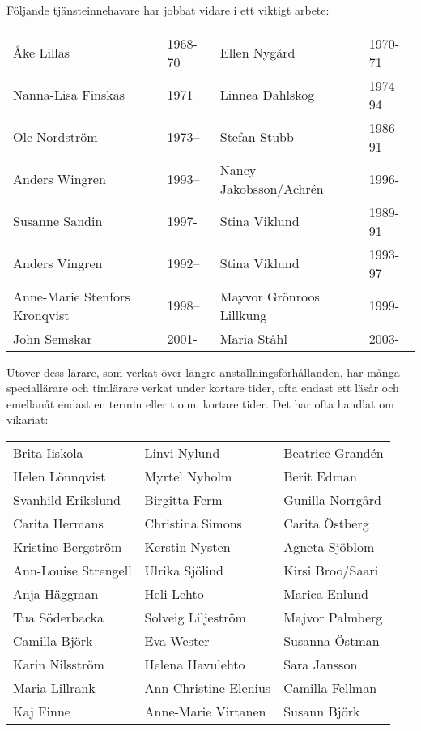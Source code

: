 Följande tjänsteinnehavare har jobbat vidare i ett viktigt arbete:
\begin{center}
  \begin{tabular}{l l l l}
    \hline
    Åke Lillas & 1968-70 & Ellen Nygård & 1970-71 \\
    Nanna-Lisa Finskas & 1971--\allowbreak 2007 &  Linnea Dahlskog & 1974-94 \\
    Ole Nordström & 1973--\allowbreak 1997 & Stefan Stubb & 1986-91 \\
    Anders Wingren & 1993--\allowbreak 2001 & Nancy Jakobsson/Achrén & 1996- \\
    Susanne Sandin & 1997-     & Stina Viklund & 1989-91 \\
    Anders Vingren & 1992--\allowbreak 2001 & Stina Viklund & 1993-97 \\
    Anne-Marie Stenfors Kronqvist & 1998--& Mayvor Grönroos Lillkung & 1999- \\
    John Semskar & 2001- & Maria Ståhl & 2003- \\
    \hline
  \end{tabular}
\end{center}

Utöver dess lärare, som verkat över längre anställningsförhållanden, har många speciallärare och timlärare verkat under kortare tider, ofta endast ett läsår och emellanåt endast en termin eller t.o.m. kortare tider. Det har ofta handlat om vikariat:
\begin{center}
  \begin{tabular}{l l l}
    \hline
    Brita Iiskola & Linvi Nylund & Beatrice Grandén \\
    Helen Lönnqvist & Myrtel Nyholm & Berit Edman \\
    Svanhild Erikslund & Birgitta Ferm & Gunilla Norrgård \\
    Carita Hermans & Christina Simons & Carita Östberg \\
    Kristine Bergström & Kerstin Nysten & Agneta Sjöblom \\
    Ann-Louise Strengell & Ulrika Sjölind & Kirsi Broo/Saari \\
    Anja Häggman & Heli Lehto & Marica Enlund \\
    Tua Söderbacka & Solveig Liljeström & Majvor Palmberg \\
    Camilla Björk & Eva Wester & Susanna Östman \\
    Karin Nilsström & Helena Havulehto & Sara Jansson \\
    Maria Lillrank & Ann-Christine Elenius & Camilla Fellman \\
    Kaj Finne & Anne-Marie Virtanen & Susann Björk \\
    \hline
  \end{tabular}
\end{center}


